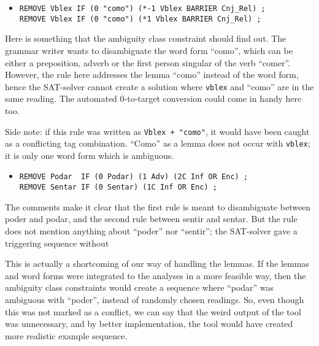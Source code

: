 \begin{itemize}
\item[] 
\begin{verbatim}
REMOVE Vblex IF (0 "como") (*-1 Vblex BARRIER Cnj_Rel) ;
REMOVE Vblex IF (0 "como") (*1 Vblex BARRIER Cnj_Rel) ;
\end{verbatim}
\end{itemize}

Here is something that the ambiguity class constraint should find out.
The grammar writer wants to disambiguate the word form ``como'', which can be either a preposition, adverb or the first person singular of the verb ``comer''. 
However, the rule here addresses the lemma ``como'' instead of the word form, hence the SAT-solver cannot create a solution where \texttt{vblex} and ``como'' are in the same reading. The automated 0-to-target conversion could come in handy here too.

Side note: if this rule was written as \texttt{Vblex + "como"}, it would have been caught as a conflicting tag combination. ``Como'' as a lemma does not occur with \texttt{vblex}; it is only one word form which is ambiguous.

\begin{itemize}
\item[] 
\begin{verbatim}
REMOVE Podar  IF (0 Podar) (1 Adv) (2C Inf OR Enc) ;
REMOVE Sentar IF (0 Sentar) (1C Inf OR Enc) ;
\end{verbatim}
\end{itemize}

The comments make it clear that the first rule is meant to disambiguate between poder and podar, and the second rule between sentir and sentar. But the rule does not mention anything about ``poder'' nor ``sentir''; the SAT-solver gave a triggering sequence without 

This is actually a shortcoming of our way of handling the lemmas. If the lemmas and word forms were integrated to the analyses in a more feasible way, then the ambiguity class constraints would create a sequence where ``podar'' was ambiguous with ``poder'', instead of randomly chosen readings. So, even though this was not marked as a conflict, we can say that the weird output of the tool was unnecessary, and by better implementation, the tool would have created more realistic example sequence.




